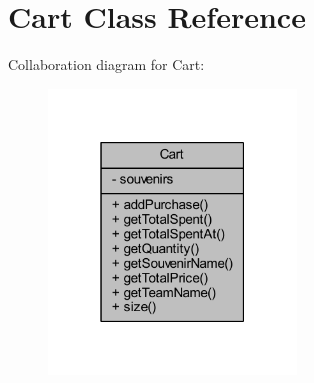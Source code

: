 \hypertarget{class_cart}{}\section{Cart Class Reference}
\label{class_cart}


Collaboration diagram for Cart\+:
\nopagebreak
\begin{figure}[H]
\begin{center}
\leavevmode
\includegraphics[width=187pt]{class_cart__coll__graph}
\end{center}
\end{figure}
